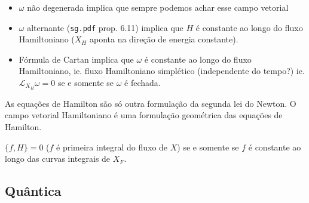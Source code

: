 \begin{itemize}
\item $\omega$ n\~ao degenerada implica que sempre podemos achar esse campo vetorial

\item  $\omega$ alternante (\texttt{sg.pdf} prop. 6.11) implica que $H$ \'e constante ao longo do fluxo Hamiltoniano ($X_H$ aponta na  dire\c c\~ao de energia constante).

\item F\'ormula de Cartan implica que $\omega$  \'e constante ao longo do fluxo Hamiltoniano, ie. fluxo Hamiltoniano simpl\'etico (independente do tempo?) ie. $\mathcal{L}_{X_H}\omega=0$ se e somente se $\omega$ \'e fechada.
\end{itemize}

As equa\c c\~oes de Hamilton s\~ao s\'o outra formula\c c\~ao da segunda lei do Newton. O campo vetorial Hamiltoniano \'e uma formula\c c\~ao geom\'etrica das equa\c c\~oes de Hamilton.

\begin{prop}
	$\{f,H\}=0$ ($f$ \'e primeira integral do fluxo de $X$) se e somente se $f$ \'e constante ao longo das curvas integrais de $X_F$.
\end{prop}

\subsection{Qu\^antica}


